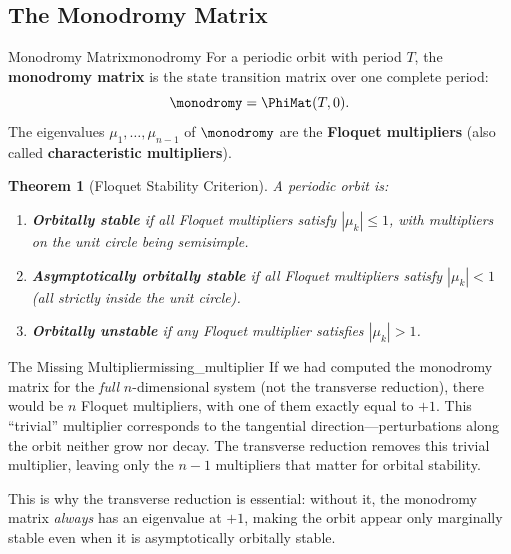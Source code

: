 \documentclass[12pt, openany]{book}
\theoremstyle{plain}
\newtheorem{theorem}{Theorem}[chapter]
\begin{document}
\subsection{The Monodromy Matrix}

\begin{definition}{Monodromy Matrix}{monodromy}
  For a periodic orbit with period $T$, the \textbf{monodromy matrix}
  is the state transition matrix over one complete period:
  \begin{equation}
    \monodromy = \PhiMat(T, 0).
  \end{equation}
  The eigenvalues $\mu_1, \ldots, \mu_{n-1}$ of $\monodromy$ are the
  \textbf{Floquet multipliers} (also called \textbf{characteristic
  multipliers}).
\end{definition}

\begin{theorem}[Floquet Stability Criterion]\label{thm:floquet}
  A periodic orbit is:
  \begin{enumerate}[label=(\roman*)]
    \item \textbf{Orbitally stable} if all Floquet multipliers satisfy
      $|\mu_k| \leq 1$, with multipliers on the unit circle being
      semisimple.
    \item \textbf{Asymptotically orbitally stable} if all Floquet multipliers
      satisfy $|\mu_k| < 1$ (all strictly inside the unit circle).
    \item \textbf{Orbitally unstable} if any Floquet multiplier satisfies
      $|\mu_k| > 1$.
  \end{enumerate}
\end{theorem}

\begin{remark}{The Missing Multiplier}{missing_multiplier}
  If we had computed the monodromy matrix for the \emph{full}
  $n$-dimensional system (not the transverse reduction), there would be
  $n$ Floquet multipliers, with one of them exactly equal to $+1$. This
  ``trivial'' multiplier corresponds to the tangential direction---perturbations
  along the orbit neither grow nor decay. The transverse reduction removes
  this trivial multiplier, leaving only the $n - 1$ multipliers that
  matter for orbital stability.

  This is why the transverse reduction is essential: without it, the
  monodromy matrix \emph{always} has an eigenvalue at $+1$, making the
  orbit appear only marginally stable even when it is asymptotically
  orbitally stable.
\end{remark}
\end{document}
